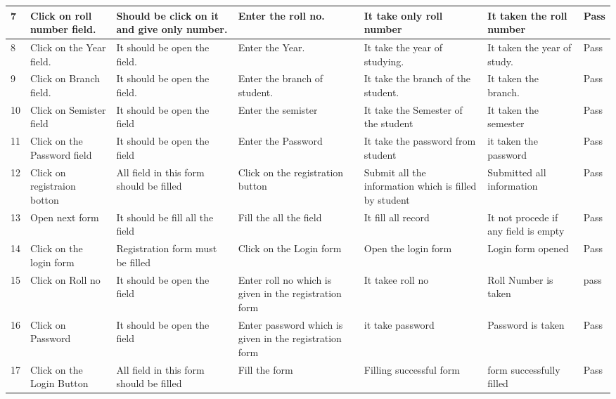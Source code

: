 \begin{center}
\begin{landscape}
\begin{longtable}{|p{1cm}|p{3.4cm}|p{4cm}|p{4cm}|p{3cm}|p{3cm}|p{1cm}|}
    7     & Click on roll number field. &  Should be click on it  and give only number. & Enter the roll no. & It take only roll number  & It taken the roll number  & Pass\\ \hline

 8  & Click on the Year field. & It  should be open the field. & Enter the Year.  & It take the year of studying. & It taken the year of study. & Pass \\ \hline

  9   & Click on Branch field. & It  should be open the field. & Enter the branch of student. & It take the branch of the student. & It taken the branch.  & Pass \\ \hline

    10    & Click on  Semister field & It  should be open the field & Enter the semister   & It take the Semester of the student & It taken the semester & Pass \\ \hline

    11    & Click on the Password field & It  should be open the field & Enter the Password & It take the password from student & it taken the password & Pass \\ \hline

    12    & Click on  registraion botton & All field in this form should be filled & Click on the registration button & Submit all the information which is filled by student  & Submitted all information & Pass \\ \hline

    13    & Open next form & It should be fill all the field & Fill the all the field & It fill all record & It not procede if any field is empty & Pass \\ \hline

    14    & Click on the login form & Registration form must be filled & Click on the Login form & Open the login form & Login form opened & Pass \\ \hline

    15    & Click on Roll no & It  should be open the field & Enter roll no which is given in the registration form & It takee roll no & Roll Number is taken & pass \\ \hline

    16    & Click on Password & It  should be open the field & Enter password  which is given in the registration form & it take password & Password is taken  & Pass \\ \hline

    17    & Click on the Login Button & All field in this form should be filled & Fill the form & Filling successful form & form successfully filled & Pass \\ \hline


\end{longtable}
\end{landscape}
\end{center}
